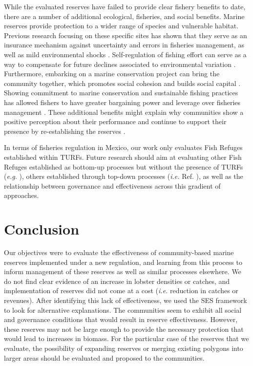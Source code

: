 \documentclass[10pt,letterpaper]{article}
\begin{document}
While the evaluated reserves have failed to provide clear fishery benefits to date, there are a number of additional ecological, fisheries, and social benefits. Marine reserves provide protection to a wider range of species and vulnerable habitat. Previous research focusing on these specific sites has shown that they serve as an insurance mechanism against uncertainty and errors in fisheries management, as well as mild environmental shocks \cite{micheli_2012-EU,deleo_2015,roberts_2017-J9,aalto}. Self-regulation of fishing effort can serve as a way to compensate for future declines associated to environmental variation \cite{finkbeiner_2018}. Furthermore, embarking on a marine conservation project can bring the community together, which promotes social cohesion and builds social capital \cite{fulton_2019}. Showing commitment to marine conservation and sustainable fishing practices has allowed fishers to have greater bargaining power and leverage over fisheries management \cite{prezramrez_2012}. These additional benefits might explain why communities show a positive perception about their performance and continue to support their presence by re-establishing the reserves \cite{ayer_2018,bennett_2019}.

In terms of fisheries regulation in Mexico, our work only evaluates Fish Refuges established within TURFs. Future research should aim at evaluating other Fish Refuges established as bottom-up processes but without the presence of TURFs (\emph{e.g.} \cite{dof_websiteC_2012}), others established through top-down processes (\emph{i.e.} Ref. \cite{dof_websiteU_2018}), as well as the relationship between governance and effectiveness across this gradient of approaches. 

\section*{Conclusion}

Our objectives were to evaluate the effectiveness of community-based marine reserves implemented under a new regulation, and learning from this process to inform management of these reserves as well as similar processes elsewhere. We do not find clear evidence of an increase in lobster densities or catches, and implementation of reserves did not come at a cost (\emph{i.e.} reduction in catches or revenues). After identifying this lack of effectiveness, we used the SES framework to look for alternative explanations. The communities seem to exhibit all social and governance conditions that would result in reserve effectiveness. However, these reserves may not be large enough to provide the necessary protection that would lead to increases in biomass. For the particular case of the reserves that we evaluate, the possibility of expanding reserves or merging existing polygons into larger areas should be evaluated and proposed to the communities.
\end{document}
